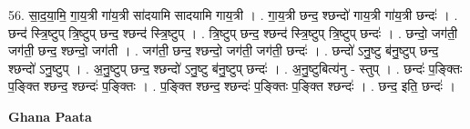 \documentclass[17pt]{extarticle}
\begin{document}
56. सा॒द॒या॒मि॒ गा॒य॒त्री गा॑य॒त्री सा॑दयामि सादयामि गाय॒त्री । . गा॒य॒त्री छन्द॒ श्छन्दो॑ गाय॒त्री गा॑य॒त्री छन्दः॑ । . छन्द॑ स्त्रि॒ष्टुप् त्रि॒ष्टुप् छन्द॒ श्छन्द॑ स्त्रि॒ष्टुप् । . त्रि॒ष्टुप् छन्द॒ श्छन्द॑ स्त्रि॒ष्टुप् त्रि॒ष्टुप् छन्दः॑ । . छन्दो॒ जग॑ती॒ जग॑ती॒ छन्द॒ श्छन्दो॒ जग॑ती । . जग॑ती॒ छन्द॒ श्छन्दो॒ जग॑ती॒ जग॑ती॒ छन्दः॑ । . छन्दो॑ ऽनु॒ष्टु ब॑नु॒ष्टुप् छन्द॒ श्छन्दो॑ ऽनु॒ष्टुप् । . अ॒नु॒ष्टुप् छन्द॒ श्छन्दो॑ ऽनु॒ष्टु ब॑नु॒ष्टुप् छन्दः॑ । . अ॒नु॒ष्टुबित्य॑नु - स्तुप् । . छन्दः॑ प॒ङ्क्तिः प॒ङ्क्ति श्छन्द॒ श्छन्दः॑ प॒ङ्क्तिः । . प॒ङ्क्ति श्छन्द॒ श्छन्दः॑ प॒ङ्क्तिः प॒ङ्क्ति श्छन्दः॑ । . छन्द॒ इति॒ छन्दः॑ । \newline

\textbf{Ghana Paata } \newline
\end{document}
